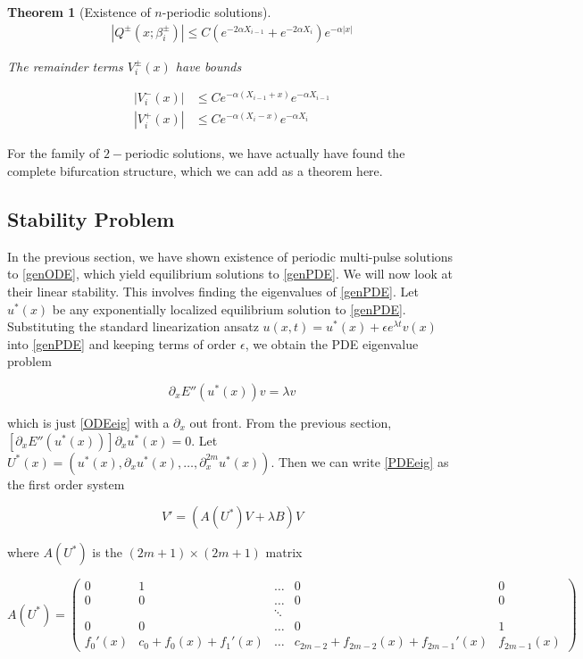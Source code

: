 \documentclass[12pt]{article}
\newtheorem{theorem}{Theorem}
\begin{document}
\begin{theorem}[Existence of $n$-periodic solutions]
\begin{align*}
|Q^\pm(x; \beta_i^\pm)| \leq C (e^{-2 \alpha X_{i-1}} + e^{-2 \alpha X_i})e^{-\alpha |x|}
\end{align*} 

The remainder terms $V_i^\pm(x)$ have bounds

\begin{align}
|V_i^-(x)| &\leq C e^{-\alpha(X_{i-1} + x)}e^{-\alpha X_{i-1}} \\
|V_i^+(x)| &\leq C e^{-\alpha(X_i - x)}e^{-\alpha X_i} 
\end{align} 
\end{theorem}

For the family of $2-$periodic solutions, we have actually have found the complete bifurcation structure, which we can add as a theorem here.

\subsection{Stability Problem}

In the previous section, we have shown existence of periodic multi-pulse solutions to \eqref{genODE}, which yield equilibrium solutions to \eqref{genPDE}. We will now look at their linear stability. This involves finding the eigenvalues of \eqref{genPDE}. Let $u^*(x)$ be any exponentially localized equilibrium solution to \eqref{genPDE}. Substituting the standard linearization ansatz $u(x, t) = u^*(x) + \epsilon e^{\lambda t}v(x)$ into \eqref{genPDE} and keeping terms of order $\epsilon$, we obtain the PDE eigenvalue problem

\begin{equation}\label{PDEeig}
\partial_x E''(u^*(x)) v = \lambda v
\end{equation}

which is just \eqref{ODEeig} with a $\partial_x$ out front. From the previous section, $[\partial_x E''(u^*(x))] \partial_x u^*(x) = 0$. Let $U^*(x) = (u^*(x), \partial_x u^*(x), \dots, \partial_x^{2m}u^*(x))$. Then we can write \eqref{PDEeig} as the first order system 

\begin{equation}\label{PDEeig2}
V' = ( A(U^*)V + \lambda B)V 
\end{equation}

where $A(U^*)$ is the $(2m+1) \times (2m+1)$ matrix

\begin{equation}\label{DefA}
A(U^*) = \begin{pmatrix}
0 & 1 & \dots & 0 & 0 \\
0 & 0 & \dots & 0 & 0 \\
& & \ddots  \\
0 & 0 & \dots & 0 & 1 \\
f_0'(x) & c_0 + f_0(x) + f_1'(x) & \dots & c_{2m-2} + f_{2m-2}(x) + f_{2m-1}' (x) & f_{2m-1}(x)
\end{pmatrix}
\end{equation}
\end{document}
